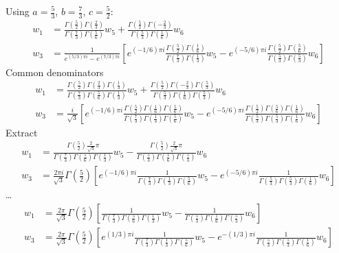 \documentclass[11pt,a4paper,twoside,leqno,noamsfonts]{amsart}
\numberwithin{equation}{section}
\begin{document}
\begin{example}[Airy]
\color{Turquoise}
Using $a = \tfrac{5}{3}$, $b = \tfrac{7}{3}$, $c = \tfrac{5}{2}$:
\begin{align*}
w_1 & = \frac{\Gamma(\tfrac{5}{2}) \Gamma(\tfrac{2}{3})}{\Gamma(\tfrac{7}{3}) \Gamma(\tfrac{5}{6})} w_5 + \frac{\Gamma(\tfrac{5}{2}) \Gamma(-\tfrac{2}{3})}{\Gamma(\tfrac{5}{3}) \Gamma(\tfrac{1}{6})} w_6 \\
w_3 & = \frac{1}{e^{(5/3)\pi i} - e^{(7/3)\pi i}} \left[ e^{(-1/6) \pi i} \frac{\Gamma(\tfrac{5}{2}) \Gamma(\tfrac{1}{6})}{\Gamma(\tfrac{7}{3}) \Gamma(\tfrac{1}{3})} w_5 - e^{(-5/6) \pi i} \frac{\Gamma(\tfrac{5}{2}) \Gamma(\tfrac{5}{6})}{\Gamma(\tfrac{5}{3}) \Gamma(\tfrac{5}{3})} w_6 \right]
\end{align*}
Common denominators
\begin{align*}
w_1 & = \frac{\Gamma(\tfrac{5}{2}) \Gamma(\tfrac{2}{3}) \Gamma(\tfrac{1}{3})}{\Gamma(\tfrac{7}{3}) \Gamma(\tfrac{5}{6}) \Gamma(\tfrac{1}{3})} w_5 + \frac{\Gamma(\tfrac{5}{2}) \Gamma(-\tfrac{2}{3}) \Gamma(\tfrac{5}{3})}{\Gamma(\tfrac{5}{3}) \Gamma(\tfrac{1}{6}) \Gamma(\tfrac{5}{3})} w_6 \\
w_3 & = \frac{i}{\sqrt{3}} \left[ e^{(-1/6) \pi i} \frac{\Gamma(\tfrac{5}{2}) \Gamma(\tfrac{1}{6}) \Gamma(\tfrac{5}{6})}{\Gamma(\tfrac{7}{3}) \Gamma(\tfrac{1}{3}) \Gamma(\tfrac{5}{6})} w_5 - e^{(-5/6) \pi i} \frac{\Gamma(\tfrac{5}{2}) \Gamma(\tfrac{5}{6}) \Gamma(\tfrac{1}{6})}{\Gamma(\tfrac{5}{3}) \Gamma(\tfrac{5}{3}) \Gamma(\tfrac{1}{6})} w_6 \right]
\end{align*}
Extract
\begin{align*}
w_1 & = \frac{\Gamma(\tfrac{5}{2}) \tfrac{2}{\sqrt{3}}\pi}{\Gamma(\tfrac{7}{3}) \Gamma(\tfrac{5}{6}) \Gamma(\tfrac{1}{3})} w_5 - \frac{\Gamma(\tfrac{5}{2}) \tfrac{2}{\sqrt{3}}\pi}{\Gamma(\tfrac{5}{3}) \Gamma(\tfrac{1}{6}) \Gamma(\tfrac{5}{3})} w_6 \\
w_3 & = \frac{2\pi i}{\sqrt{3}} \Gamma(\tfrac{5}{2}) \left[ e^{(-1/6) \pi i} \frac{1}{\Gamma(\tfrac{7}{3}) \Gamma(\tfrac{1}{3}) \Gamma(\tfrac{5}{6})} w_5 - e^{(-5/6) \pi i} \frac{1}{\Gamma(\tfrac{5}{3}) \Gamma(\tfrac{5}{3}) \Gamma(\tfrac{1}{6})} w_6 \right]
\end{align*}
\ldots
\begin{align*}
w_1 & = \frac{2\pi}{\sqrt{3}} \Gamma(\tfrac{5}{2}) \left[ \frac{1}{\Gamma(\tfrac{7}{3}) \Gamma(\tfrac{5}{6}) \Gamma(\tfrac{1}{3})} w_5 - \frac{1}{\Gamma(\tfrac{5}{3}) \Gamma(\tfrac{1}{6}) \Gamma(\tfrac{5}{3})} w_6 \right] \\
w_3 & = \frac{2\pi}{\sqrt{3}} \Gamma(\tfrac{5}{2}) \left[ e^{(1/3) \pi i} \frac{1}{\Gamma(\tfrac{7}{3}) \Gamma(\tfrac{1}{3}) \Gamma(\tfrac{5}{6})} w_5 - e^{-(1/3) \pi i} \frac{1}{\Gamma(\tfrac{5}{3}) \Gamma(\tfrac{5}{3}) \Gamma(\tfrac{1}{6})} w_6 \right]

\end{align*}
\end{example}
\end{document}
